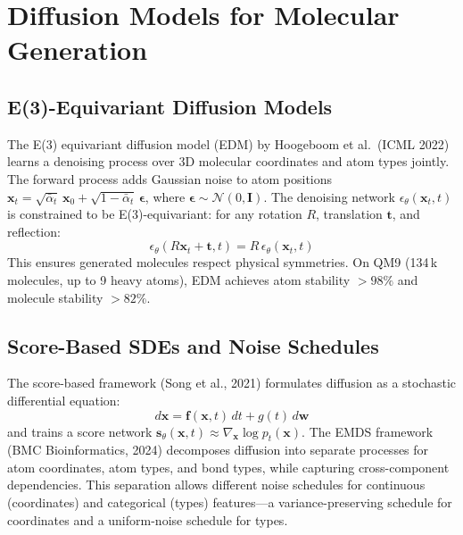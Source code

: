 \documentclass[11pt,a4paper]{article}
\begin{document}
\section{Diffusion Models for Molecular Generation}
\label{sec:diffusion}

\subsection{E(3)-Equivariant Diffusion Models}

The E(3) equivariant diffusion model (EDM) by Hoogeboom et al.\ (ICML 2022) learns a denoising process over 3D molecular coordinates and atom types jointly.
The forward process adds Gaussian noise to atom positions $\mathbf{x}_t = \sqrt{\bar\alpha_t}\,\mathbf{x}_0 + \sqrt{1-\bar\alpha_t}\,\boldsymbol\epsilon$, where $\boldsymbol\epsilon \sim \mathcal{N}(0, \mathbf{I})$.
The denoising network $\epsilon_\theta(\mathbf{x}_t, t)$ is constrained to be E(3)-equivariant: for any rotation $R$, translation $\mathbf{t}$, and reflection:
\begin{equation}
\epsilon_\theta(R\mathbf{x}_t + \mathbf{t}, t) = R\,\epsilon_\theta(\mathbf{x}_t, t)
\end{equation}
This ensures generated molecules respect physical symmetries.
On QM9 (134\,k molecules, up to 9 heavy atoms), EDM achieves atom stability $> 98\%$ and molecule stability $> 82\%$.

\subsection{Score-Based SDEs and Noise Schedules}

The score-based framework (Song et al., 2021) formulates diffusion as a stochastic differential equation:
\begin{equation}
d\mathbf{x} = \mathbf{f}(\mathbf{x}, t)\,dt + g(t)\,d\mathbf{w}
\end{equation}
and trains a score network $\mathbf{s}_\theta(\mathbf{x}, t) \approx \nabla_{\mathbf{x}} \log p_t(\mathbf{x})$.
The EMDS framework (BMC Bioinformatics, 2024) decomposes diffusion into separate processes for atom coordinates, atom types, and bond types, while capturing cross-component dependencies.
This separation allows different noise schedules for continuous (coordinates) and categorical (types) features---a variance-preserving schedule for coordinates and a uniform-noise schedule for types.
\end{document}
